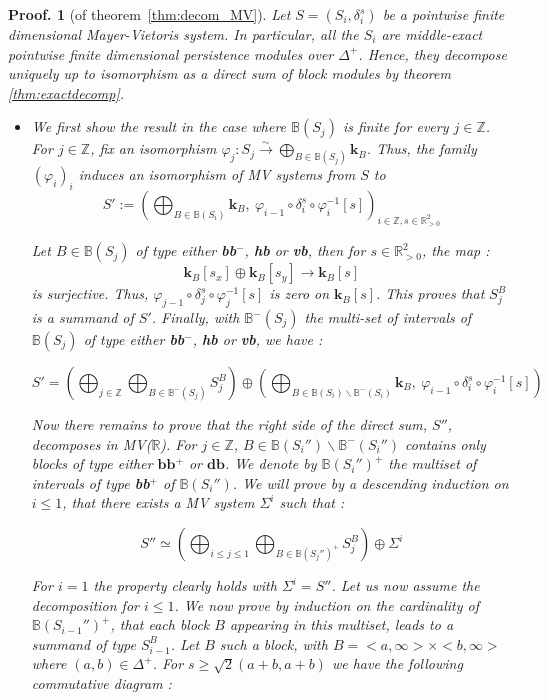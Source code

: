 \documentclass[a4paper, english, 11pt]{article}
\newcommand{\kk}[0]{\textbf{k}}
\newcommand{\0}{\vec{0}}
\newcommand{\R}[0]{\mathbb{R}}
\newcommand{\Z}[0]{\mathbb{Z}}
\newtheorem*{pf}{Proof.} }
\begin{document}
\begin{pf}[of theorem~\ref{thm:decom_MV}] Let $S =(S_i,\delta_i^s)$ be a pointwise finite dimensional Mayer-Vietoris system. In particular, all the $S_i$ are middle-exact pointwise finite dimensional persistence modules over $\Delta^+$. Hence, they decompose uniquely up to isomorphism as a direct sum of block modules by theorem \ref{thm:exactdecomp}.
\begin{itemize}
    \item[The finite barcode case :] We first show the result in the case where $\mathbb{B}(S_j)$ is finite for every $j\in\Z$.  For $j\in\Z$, fix an isomorphism $\varphi_j : S_j \stackrel{\sim}{\longrightarrow}\bigoplus_{B\in\mathbb{B}(S_j)}\kk_B$. Thus, the family $(\varphi_i)_i$ induces an isomorphism of MV systems from $S$ to 
    $$S' := \left(\bigoplus_{B\in\mathbb{B}(S_i)}\kk_B, ~\varphi_{i-1}\circ \delta_i^s \circ \varphi_i^{-1}[s] \right )_{i\in\Z,s\in \R_{>0}^2}$$ 
  
  Let $B\in \mathbb{B}(S_j)$ of type either \textbf{bb}$^-$, \textbf{hb} or \textbf{vb}, then for $s\in \R_{>0}^2$, the map :  $$\kk_B[s_x]\oplus\kk_B[s_y]\longrightarrow \kk_B[s]$$ is surjective. Thus,  $\varphi_{j-1}\circ \delta_j^s \circ \varphi_j^{-1}[s]$ is zero on $\kk_B[s]$. This proves that $S^B_j$ is a summand of $S'$. Finally, with $\mathbb{B}^{-}(S_j)$ the multi-set of intervals of $\mathbb{B}(S_j)$ of type either \textbf{bb}$^-$, \textbf{hb} or \textbf{vb}, we have : 
  
 $$S' = \left (\bigoplus_{j\in\Z} \bigoplus_{B\in  \mathbb{B}^{-}(S_j) } S^B_j \right ) \oplus \left ( \bigoplus_{B\in\mathbb{B}(S_i)\backslash \mathbb{B}^{-}(S_i)}\kk_B, ~\varphi_{i-1}\circ \delta_i^s \circ \varphi_i^{-1}[s] \right )$$ 
 
 Now there remains to prove that the right side of the direct sum, $S''$, decomposes in MV($\R$). For $j\in\Z$, $B\in\mathbb{B}(S_i'')\backslash \mathbb{B}^{-}(S_i'')$ contains only blocks of type either $\textbf{bb$^+$}$ or $\textbf{db}$. We denote by $\mathbb{B}(S_i'')^+$ the multiset of intervals of type \textbf{bb$^+$} of $\mathbb{B}(S_i'')$.
 We will prove by a descending induction on $i\leq 1$, that there exists a MV system $\Sigma^i$ such that : 
 
 $$S'' \simeq \left ( \bigoplus_{i\leq j\leq 1} \bigoplus_{B\in \mathbb{B}(S_j'')^+ } S_j^B \right ) \oplus \Sigma^i $$
 
 For $i = 1$ the property clearly holds with $\Sigma^i = S''$.
 Let us now assume the decomposition for $i\leq 1$. We now prove by induction on the cardinality of $\mathbb{B}(S_{i-1}'')^+$, that each block $B$ appearing in this multiset, leads to a summand of type $S_{i-1}^B$. Let $B$ such a block, with $B = <a,\infty> \times <b,\infty>$ where $(a,b) \in \Delta^+$. For $s \geq \sqrt{2}(a+b,a+b)$  we have the following commutative diagram : 
 

\end{itemize}
\end{pf}
\end{document}
